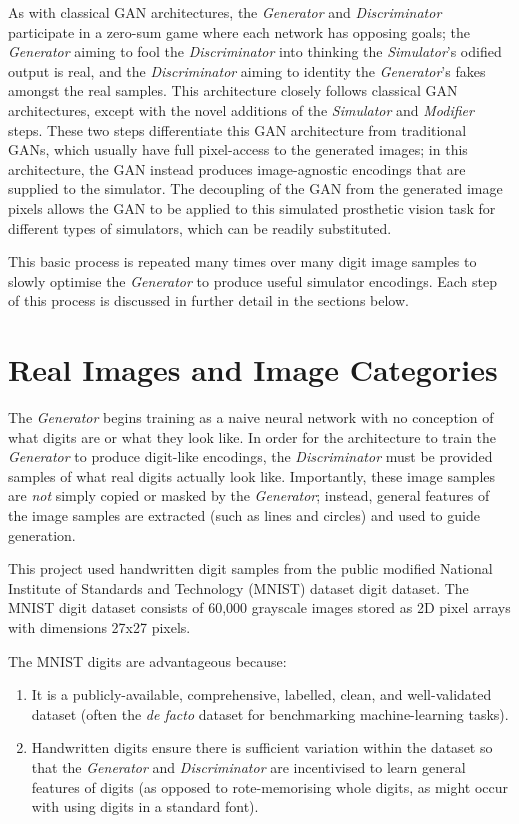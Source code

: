 \documentclass[a4paper,11pt,openany]{book}
\begin{document}
As with classical GAN architectures, the \emph{Generator} and \emph{Discriminator} participate in a zero-sum game where each network has opposing goals; the \emph{Generator} aiming to fool the \emph{Discriminator} into thinking the \emph{Simulator}'s odified output is real, and the \emph{Discriminator} aiming to identity the \emph{Generator}'s fakes amongst the real samples.
This architecture closely follows classical GAN architectures, except with the novel additions of the \emph{Simulator} and \emph{Modifier} steps.
These two steps differentiate this GAN architecture from traditional GANs, which usually have full pixel-access to the generated images; in this architecture, the GAN instead produces image-agnostic encodings that are supplied to the simulator.
The decoupling of the GAN from the generated image pixels allows the GAN to be applied to this simulated prosthetic vision task for different types of simulators, which can be readily substituted.

This basic process is repeated many times over many digit image samples to slowly optimise the \emph{Generator} to produce useful simulator encodings.
Each step of this process is discussed in further detail in the sections below.

\section*{Real Images and Image Categories}
\label{sec:org2b79f03}

The \emph{Generator} begins training as a naive neural network with no conception of what digits are or what they look like.
In order for the architecture to train the \emph{Generator} to produce digit-like encodings, the \emph{Discriminator} must be provided samples of what real digits actually look like.
Importantly, these image samples are \emph{not} simply copied or masked by the \emph{Generator}; instead, general features of the image samples are extracted (such as lines and circles) and used to guide generation.

This project used handwritten digit samples from the public modified National Institute of Standards and Technology (MNIST) dataset digit dataset. \cite{Lecun1998}
The MNIST digit dataset consists of 60,000 grayscale images stored as 2D pixel arrays with dimensions 27x27 pixels.

The MNIST digits are advantageous because:
\begin{enumerate}
\item It is a publicly-available, comprehensive, labelled, clean, and well-validated dataset (often the \emph{de facto} dataset for benchmarking machine-learning tasks).
\item Handwritten digits ensure there is sufficient variation within the dataset so that the \emph{Generator} and \emph{Discriminator} are incentivised to learn general features of digits (as opposed to rote-memorising whole digits, as might occur with using digits in a standard font).
\end{enumerate}
\end{document}
